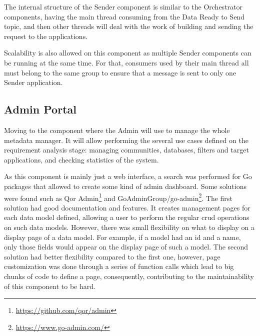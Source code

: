 The internal structure of the Sender component is similar to the Orchestrator components, having the main thread consuming from the Data Ready to Send topic, and then other threads will deal with the work of building and sending the request to the applications.

Scalability is also allowed on this component as multiple Sender components can be running at the same time.
For that, consumers used by their main thread all must belong to the same group to ensure that a message is sent to only one Sender application.

\subsection{Admin Portal}

Moving to the component where the Admin will use to manage the whole metadata manager.
It will allow performing the several use cases defined on the requirement analysis stage: managing communities, databases, filters and target applications, and checking statistics of the system.

As this component is mainly just a web interface, a search was performed for Go packages that allowed to create some kind of admin dashboard.
Some solutions were found such as Qor Admin\footnote{\url{https://github.com/qor/admin}} and GoAdminGroup/go-admin\footnote{\url{https://www.go-admin.com/}}.
The first solution had good documentation and features.
It creates management pages for each data model defined, allowing a user to perform the regular \gls{crud} operations on such data models.
However, there was small flexibility on what to display on a display page of a data model.
For example, if a model had an id and a name, only those fields would appear on the display page of such a model.
The second solution had better flexibility compared to the first one, however, page customization was done through a series of function calls which lead to big chunks of code to define a page, consequently, contributing to the maintainability of this component to be hard.

